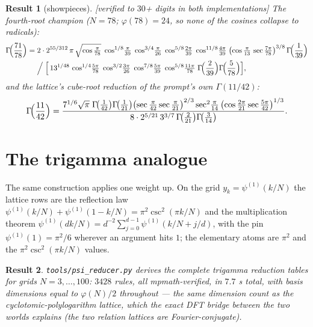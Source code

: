 \documentclass[11pt]{article}
\newtheorem{result}{Result}[section]
\theoremstyle{remark}
\newcommand{\dps}[1]{\textsf{\footnotesize[#1]}}
\begin{document}
\begin{result}[showpieces]\label{res:showpieces}
\dps{verified to $30$+ digits in both implementations}
The fourth-root champion ($N=78$; $\varphi(78)=24$, so none of the cosines collapse to
radicals):
\begin{align*}
\Gamma\!\Bigl(\frac{71}{78}\Bigr)
={}&2\cdot2^{55/312}\,\pi\,\sqrt{\cos\tfrac{\pi}{78}}\;
\cos^{1/8}\!\tfrac{\pi}{39}\;\cos^{3/4}\!\tfrac{\pi}{26}\;
\cos^{5/8}\!\tfrac{2\pi}{39}\;\cos^{11/8}\!\tfrac{4\pi}{39}\;
\bigl(\cos\tfrac{\pi}{13}\,\sec\tfrac{7\pi}{78}\bigr)^{3/8}\,
\Gamma\!\Bigl(\frac{1}{39}\Bigr)\\
&\Big/\;\Bigl[\,13^{1/48}\,
\cos^{1/4}\!\tfrac{5\pi}{78}\;\cos^{3/2}\!\tfrac{3\pi}{26}\;
\cos^{7/8}\!\tfrac{5\pi}{39}\;\cos^{5/8}\!\tfrac{11\pi}{78}\;
\Gamma\!\Bigl(\frac{2}{39}\Bigr)\Gamma\!\Bigl(\frac{5}{78}\Bigr)\Bigr],
\end{align*}
and the lattice's cube-root reduction of the prompt's own $\Gamma(11/42)$:
\[
\Gamma\!\Bigl(\frac{11}{42}\Bigr)
=\frac{7^{1/6}\sqrt{\pi}\;\Gamma\!\bigl(\tfrac1{42}\bigr)\Gamma\!\bigl(\tfrac1{21}\bigr)
\bigl(\sec\tfrac{\pi}{42}\sec\tfrac{\pi}{21}\bigr)^{2/3}
\sec^2\!\tfrac{\pi}{14}\,\bigl(\cos\tfrac{2\pi}{21}\sec\tfrac{5\pi}{42}\bigr)^{1/3}}
{8\cdot2^{5/21}\,3^{3/7}\,\Gamma\!\bigl(\tfrac2{21}\bigr)\Gamma\!\bigl(\tfrac3{14}\bigr)} .
\]
\end{result}

\section{The trigamma analogue}\label{sec:trigamma}

The same construction applies one weight up. On the grid $y_k=\psi^{(1)}(k/N)$ the lattice
rows are the reflection law
$\psi^{(1)}(k/N)+\psi^{(1)}(1-k/N)=\pi^2\csc^2(\pi k/N)$
and the multiplication theorem
$\psi^{(1)}(dk/N)=d^{-2}\sum_{j=0}^{d-1}\psi^{(1)}(k/N+j/d)$,
with the pin $\psi^{(1)}(1)=\pi^2/6$ wherever an argument hits $1$; the elementary atoms
are $\pi^2$ and the $\pi^2\csc^2(\pi k/N)$ values.

\begin{result}\label{res:psicensus}
\texttt{tools/psi\_reducer.py} derives the complete trigamma reduction tables for grids
$N=3,\dots,100$: $3428$ rules, all mpmath-verified, in $7.7$ s total, with basis
dimensions equal to $\varphi(N)/2$ throughout --- the same dimension count as the
cyclotomic-polylogarithm lattice, which the exact DFT bridge between the two worlds
explains (the two relation lattices are Fourier-conjugate).
\end{result}
\end{document}
